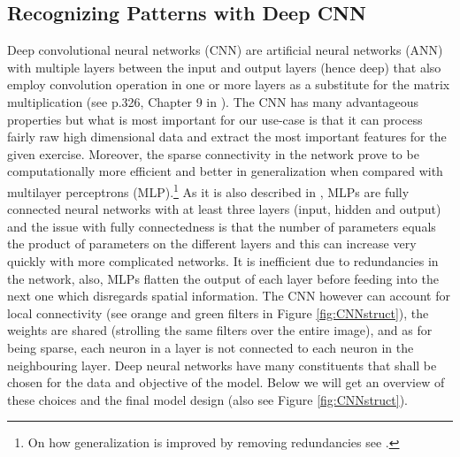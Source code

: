 \documentclass[11pt, a4paper]{article}
\begin{document}
\subsection{Recognizing Patterns with Deep CNN}
\label{subsec:DM:RecPatwCNN}
Deep convolutional neural networks (CNN) are artificial neural networks (ANN) with multiple layers between the input and output layers (hence deep) that also employ convolution operation in one or more layers as a substitute for the matrix multiplication (see p.326, Chapter 9 in \cite{goodfellow2016deep}). 
The CNN has many advantageous properties but what is most important for our use-case is that it can process fairly raw high dimensional data and extract the most important features for the given exercise. Moreover, the sparse connectivity in the network prove to be computationally more efficient and better in generalization when compared with multilayer perceptrons (MLP).\footnote{On how generalization is improved by removing redundancies see \cite{chakraborty1999effect}.} As it is also described in \cite{MLPmedium}, MLPs are fully connected neural networks with at least three layers (input, hidden and output) and the issue with fully connectedness is that the number of parameters equals the product of parameters on the different layers and this can increase very quickly with more complicated networks. It is inefficient due to redundancies in the network, also, MLPs flatten the output of each layer before feeding into the next one which disregards spatial information. The CNN however can account for local connectivity (see orange and green filters in Figure \ref{fig:CNNstruct}), the weights are shared (strolling the same filters over the entire image), and as for being sparse, each neuron in a layer is not connected to each neuron in the neighbouring layer. Deep neural networks have many constituents that shall be chosen for the data and objective of the model. Below we will get an overview of these choices and the final model design (also see Figure \ref{fig:CNNstruct}).
\end{document}
